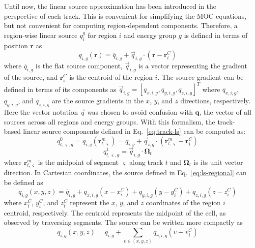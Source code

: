 Until now, the linear source approximation has been introduced in the perspective of each track. This is convenient for simplifying the MOC equations, but not convenient for computing region-dependent components. Therefore, a region-wise linear source $q_i^g$ for region $i$ and energy group $g$ is defined in terms of position $\mathbf{r}$ as
\begin{equation}
q_{i,g}(\mathbf{r}) = \overline{q}_{i,g} + \vec{q}_{i,g} \cdot \left( \mathbf{r} - \mathbf{r}^C_i \right)
\label{eq:ls-regional}
\end{equation}
where $\overline{q}_{i,g}$ is the flat source component, $\vec{q}_{i,g}$ is a vector representing the gradient of the source, and $\mathbf{r}^C_i$ is the centroid of the region $i$. The source gradient can be defined in terms of its components as $\vec{q}_{i,g} = \left[q_{x,i,g}, q_{y,i,g}, q_{z,i,g} \right]^T$ where $q_{x,i,g}$, $q_{y,i,g}$, and $q_{z,i,g}$ are the source gradients in the $x$, $y$, and $z$ directions, respectively. Here the vector notation $\vec{q}$ was chosen to avoid confusion with $\mathbf{q}$, the vector of all sources across all regions and energy groups. With this formalism, the track-based linear source components defined in Eq.~\ref{eq:track-ls} can be computed as:
\begin{equation}
q^0_{t,\varsigma,g} = q_{i,g}(\mathbf{r}^m_{t,\varsigma}) = \overline{q}_{i,g} + \vec{q}_{i,g} \cdot \left( \mathbf{r}^m_{t,\varsigma} - \mathbf{r}^C_i \right)
\end{equation}
\begin{equation}
q^1_{t,\varsigma,g} = \vec{q}_{i,g} \cdot \mathbf{\Omega}_t
\end{equation}
where $\mathbf{r}^m_{t,\varsigma}$ is the midpoint of segment $\varsigma$ along track $t$ and $\mathbf{\Omega}_t$ is its unit vector direction. In Cartesian coordinates, the source defined in Eq.~\ref{eq:ls-regional} can be defined as
\begin{equation}
q_{i,g}(x, y, z) = \overline{q}_{i,g} + q_{x,i,g} \left( x - x^C_i \right) + q_{y,i,g} \left( y - y^C_i \right) + q_{z,i,g} \left( z - z^C_i \right)
\end{equation}
where $x^C_i$, $y^C_i$, and $z^C_i$ represent the $x$, $y$, and $z$ coordinates of the region $i$ centroid, respectively. The centroid represents the midpoint of the cell, as observed by traversing segments. The source can be written more compactly as
\begin{equation}
q_{i,g}(x, y, z) = \overline{q}_{i,g} + \sum_{v \in (x,y,z)} q_{v,i,g} \left( v - v^C_i \right)
\end{equation}
